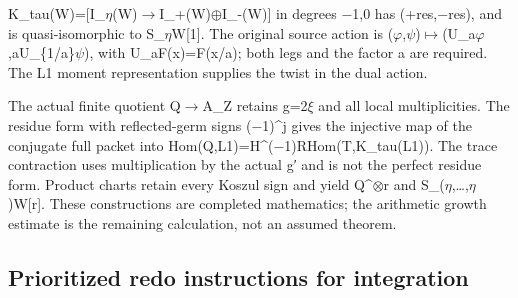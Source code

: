 \documentclass[10pt,a4paper,oneside]{report}
\begin{document}
K\_tau(W)=[I\_\allowbreak{}\ensuremath{η}\allowbreak{}(W)\allowbreak{}\ensuremath{→}\allowbreak{}I\_+(W)\allowbreak{}\ensuremath{⊕}\allowbreak{}I\_-(W)]
in degrees \allowbreak{}\ensuremath{−}\allowbreak{}1,0 has
(+res,\allowbreak{}\ensuremath{−}\allowbreak{}res), and is
quasi-isomorphic to S\_\allowbreak{}\ensuremath{η}\allowbreak{}W[1]. The
original source action is
(\allowbreak{}\ensuremath{φ}\allowbreak{},\allowbreak{}\ensuremath{ψ}\allowbreak{})\allowbreak{}\ensuremath{↦}\allowbreak{}(U\_a\allowbreak{}\ensuremath{φ}\allowbreak{},aU\_\{1/a\}\allowbreak{}\ensuremath{ψ}\allowbreak{}),
with U\_aF(x)=F(x/a); both legs and the factor a are required. The L1
moment representation supplies the twist in the dual action.

The actual finite quotient Q\allowbreak{}\ensuremath{→}\allowbreak{}A\_Z
retains g=2\allowbreak{}\ensuremath{ξ}\allowbreak{} and all local
multiplicities. The residue form with reflected-germ signs
(\allowbreak{}\ensuremath{−}\allowbreak{}1)\textasciicircum{}j gives the
injective map of the conjugate full packet into
Hom(Q,L1)=H\textasciicircum{}(\allowbreak{}\ensuremath{−}\allowbreak{}1)RHom(T,K\_tau(L1)).
The trace contraction uses multiplication by the actual g′ and is not
the perfect residue form. Product charts retain every Koszul sign and
yield Q\textasciicircum{}\allowbreak{}\ensuremath{⊗}\allowbreak{}r and
S\_(\allowbreak{}\ensuremath{η}\allowbreak{},…,\allowbreak{}\ensuremath{η}\allowbreak{})W[r].
These constructions are completed mathematics; the arithmetic growth
estimate is the remaining calculation, not an assumed theorem.

\subsection{Prioritized redo instructions for
integration}\label{prioritized-redo-instructions-for-integration}
\end{document}
